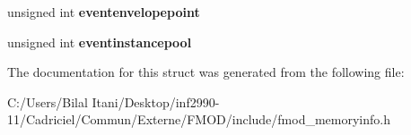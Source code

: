 \begin{DoxyCompactItemize}
\item 
unsigned int {\bfseries eventenvelopepoint}\hypertarget{struct_f_m_o_d___m_e_m_o_r_y___u_s_a_g_e___d_e_t_a_i_l_s_aeec51fe4108d9f383c5db076dcac34be}{}\label{struct_f_m_o_d___m_e_m_o_r_y___u_s_a_g_e___d_e_t_a_i_l_s_aeec51fe4108d9f383c5db076dcac34be}

\item 
unsigned int {\bfseries eventinstancepool}\hypertarget{struct_f_m_o_d___m_e_m_o_r_y___u_s_a_g_e___d_e_t_a_i_l_s_ac75baf7e2a3500aeab9a968276fa010c}{}\label{struct_f_m_o_d___m_e_m_o_r_y___u_s_a_g_e___d_e_t_a_i_l_s_ac75baf7e2a3500aeab9a968276fa010c}

\end{DoxyCompactItemize}


The documentation for this struct was generated from the following file\+:\begin{DoxyCompactItemize}
\item 
C\+:/\+Users/\+Bilal Itani/\+Desktop/inf2990-\/11/\+Cadriciel/\+Commun/\+Externe/\+F\+M\+O\+D/include/fmod\+\_\+memoryinfo.\+h\end{DoxyCompactItemize}
